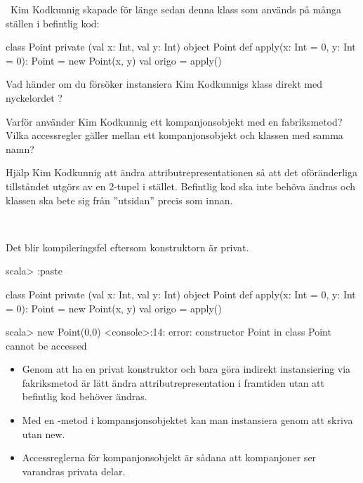 \QUESTEND






\clearpage

\AdvancedTasks %



\QUESTBEGIN

\Task \what~Kim Kodkunnig skapade för länge sedan denna klass som används på många ställen i befintlig kod:

\begin{Code}
class Point private (val x: Int, val y: Int)
object Point {
  def apply(x: Int = 0, y: Int = 0): Point = new Point(x, y)
  val origo = apply()
}
\end{Code}

\Subtask Vad händer om du försöker instansiera Kim Kodkunnigs klass direkt med nyckelordet ?

\Subtask Varför använder Kim Kodkunnig ett kompanjonsobjekt med en fabriksmetod? Vilka accessregler gäller mellan ett kompanjonsobjekt och klassen med samma namn?

\Subtask Hjälp Kim Kodkunnig att ändra attributrepresentationen så att det oföränderliga tillståndet utgörs av en 2-tupel  i stället. Befintlig kod ska inte behöva ändras och klassen  ska bete sig från ''utsidan'' precis som innan.

\SOLUTION

\TaskSolved \what~

\SubtaskSolved Det blir kompileringsfel eftersom konstruktorn är privat.
\begin{REPL}
scala> :paste

class Point private (val x: Int, val y: Int)
object Point {
  def apply(x: Int = 0, y: Int = 0): Point = new Point(x, y)
  val origo = apply()
}

scala> new Point(0,0)
<console>:14: error: constructor Point in class Point cannot be accessed
\end{REPL}

\SubtaskSolved
\begin{itemize}
  \item Genom att ha en privat konstruktor och bara göra indirekt instansiering via fakriksmetod är lätt ändra attributrepresentation i framtiden utan att befintlig kod behöver ändras.

  \item Med en -metod i kompansjonsobjektet kan man instansiera genom att skriva  utan new.

  \item Accessreglerna för kompanjonsobjekt är sådana att kompanjoner ser varandras privata delar.
\end{itemize}

